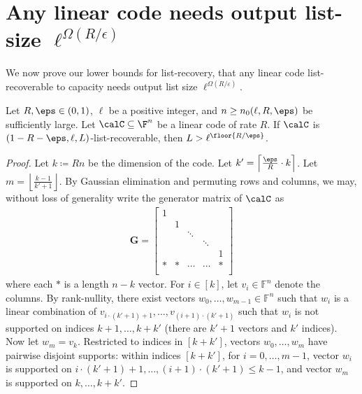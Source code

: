 \documentclass{article}
\begin{document}
\section{Any linear code needs output list-size $\ell^{\Omega(R/\epsilon)}$}\label{sec:list-rec-impossibility}
We now prove our lower bounds for list-recovery, that any linear code list-recoverable to capacity needs output list size $\ell^{\Omega(R/\varepsilon)}$.
\begin{theorem}
    Let $R,\eps\in(0,1)$, $\ell$ be a positive integer, and $n\ge n_0(\ell,R,\eps)$ be sufficiently large.
    Let $\calC \subseteq \F^n$ be a linear code of rate $R$. If $\calC$ is  $(1-R-\eps, \ell, L)$-list-recoverable, then $L> \ell^{\floor{R/\eps}}$.
    \label{thm:lb-1}
\end{theorem}
\begin{proof}
    Let $k \coloneqq Rn$ be the dimension of the code.
    Let $k' = \left \lceil{\frac{\eps}{R}\cdot k} \right \rceil$.
    Let $m = \left \lfloor{\frac{k-1}{k'+1}} \right \rfloor$.
    By Gaussian elimination and permuting rows and columns, we may, without loss of generality write the generator matrix of $\calC$ as
    \begin{align}
        \mathbf{G} = 
        \begin{bmatrix}
            1 & & & & \\
              & 1 & & & \\
              &   & \ddots & &\\
              & & & \ddots &\\
              & & & & 1\\
              \hline
              * & * & \cdots & \cdots& * \\
        \end{bmatrix}
    \end{align}
    where each $*$ is a length $n-k$ vector.
    For $i \in [k]$, let $v_i\in\mathbb{F}^n$ denote the columns.
    By rank-nullity, there exist vectors $w_0,\dots,w_{m-1}\in\mathbb{F}^n$ such that $w_i$ is a linear combination of $v_{i\cdot (k'+1)+1},\dots,v_{(i+1)\cdot (k'+1)}$ such that $w_i$ is not supported on indices $k+1,\dots,k+k'$ (there are $k'+1$ vectors and $k'$ indices).
    Now let $w_{m} = v_k$.
    Restricted to indices in $[k+k']$, vectors $w_0,\dots,w_m$ have pairwise disjoint supports: within indices $[k+k']$, for $i=0,\dots,m-1$, vector $w_i$ is supported on $i\cdot (k'+1)+1,\dots, (i+1)\cdot(k'+1)\le k-1$, and vector $w_m$ is supported on $k,\dots,k+k'$.


\end{proof}
\end{document}
